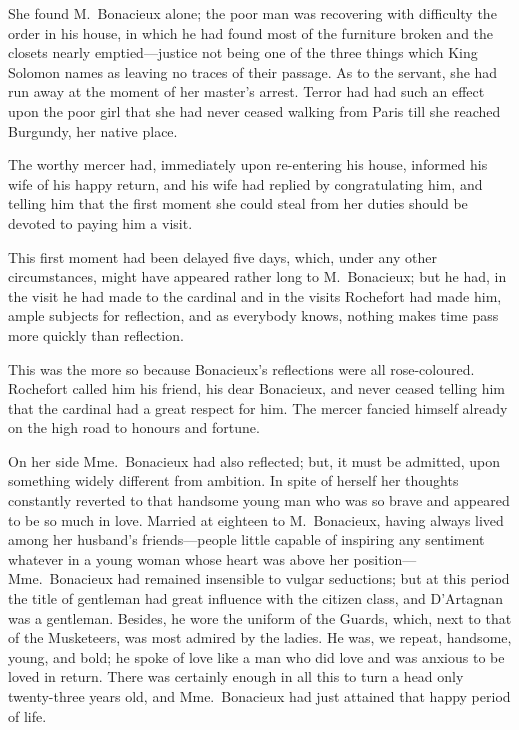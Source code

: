 She found M.~Bonacieux alone; the poor man was recovering with difficulty the order in his house, in which he had found most of the furniture broken and the closets nearly emptied—justice not being one of the three things which King Solomon names as leaving no traces of their passage. As to the servant, she had run away at the moment of her master's arrest. Terror had had such an effect upon the poor girl that she had never ceased walking from Paris till she reached Burgundy, her native place. 

The worthy mercer had, immediately upon re-entering his house, informed his wife of his happy return, and his wife had replied by congratulating him, and telling him that the first moment she could steal from her duties should be devoted to paying him a visit. 

This first moment had been delayed five days, which, under any other circumstances, might have appeared rather long to M.~Bonacieux; but he had, in the visit he had made to the cardinal and in the visits Rochefort had made him, ample subjects for reflection, and as everybody knows, nothing makes time pass more quickly than reflection. 

This was the more so because Bonacieux's reflections were all rose-coloured. Rochefort called him his friend, his dear Bonacieux, and never ceased telling him that the cardinal had a great respect for him. The mercer fancied himself already on the high road to honours and fortune. 

On her side Mme.~Bonacieux had also reflected; but, it must be admitted, upon something widely different from ambition. In spite of herself her thoughts constantly reverted to that handsome young man who was so brave and appeared to be so much in love. Married at eighteen to M.~Bonacieux, having always lived among her husband's friends—people little capable of inspiring any sentiment whatever in a young woman whose heart was above her position—Mme.~Bonacieux had remained insensible to vulgar seductions; but at this period the title of gentleman had great influence with the citizen class, and D'Artagnan was a gentleman. Besides, he wore the uniform of the Guards, which, next to that of the Musketeers, was most admired by the ladies. He was, we repeat, handsome, young, and bold; he spoke of love like a man who did love and was anxious to be loved in return. There was certainly enough in all this to turn a head only twenty-three years old, and Mme.~Bonacieux had just attained that happy period of life. 

